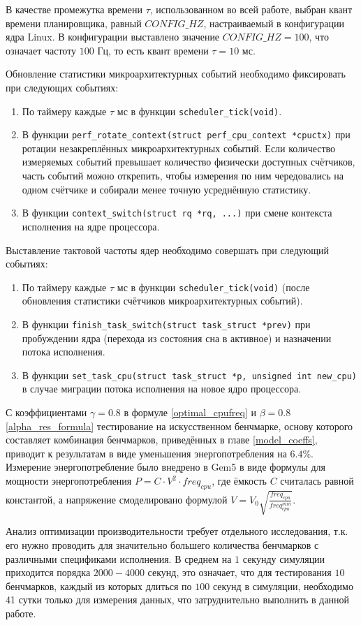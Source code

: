     В качестве промежутка времени $\tau$, использованном во всей работе, выбран квант времени планировщика,
    равный $CONFIG\_HZ$, настраиваемый в конфигурации ядра Linux. В конфигурации выставлено значение
    $CONFIG\_HZ = 100$, что означает частоту $100$ Гц, то есть квант времени $\tau = 10$ мс.

    Обновление статистики микроархитектурных событий необходимо фиксировать при следующих событиях:
    \begin{enumerate}
        \item По таймеру каждые $\tau$ мс в функции \lstinline{scheduler_tick(void)}.
        \item В функции \lstinline{perf_rotate_context(struct perf_cpu_context *cpuctx)} при ротации
        незакреплённых микроархитектурных событий. Если количество измеряемых событий
        превышает количество физически доступных счётчиков, часть событий можно открепить, чтобы измерения по ним
        чередовались на одном счётчике и собирали менее точную усреднённую статистику.
        \item В функции \lstinline{context_switch(struct rq *rq, ...)} при смене контекста исполнения на
        ядре процессора.
    \end{enumerate}

    Выставление тактовой частоты ядер необходимо совершать при следующий событиях:
    \begin{enumerate}
        \item По таймеру каждые $\tau$ мс в функции \lstinline{scheduler_tick(void)} (после обновления статистики
        счётчиков микроархитектурных событий).
        \item В функции \lstinline{finish_task_switch(struct task_struct *prev)} при пробуждении ядра
        (перехода из состояния сна в активное) и назначении потока исполнения.
        \item В функции \lstinline{set_task_cpu(struct task_struct *p, unsigned int new_cpu)} в случае миграции
        потока исполнения на новое ядро процессора.
    \end{enumerate}

    С коэффициентами $\gamma = 0.8$ в формуле \eqref{optimal_cpufreq} и $\beta = 0.8$ \eqref{alpha_res_formula}
    тестирование на искусственном бенчмарке, основу которого составляет комбинация бенчмарков, приведённых в
    главе \ref{model_coeffs}, приводит к результатам в виде уменьшения энергопотребления на $6.4\%$. Измерение
    энергопотребление было внедрено в Gem5 в виде формулы для мощности энергопотребления $P = C \cdot V^2 \cdot freq_{cpu}$,
    где ёмкость $C$ считалась равной константой, а напряжение смоделировано формулой
    $V = V_0 \sqrt{\frac{freq_{cpu}}{freq_{cpu}^{min}}}$.

    Анализ оптимизации производительности требует отдельного исследования, т.к. его нужно проводить для значительно
    большего количества бенчмарков с различными спецификами исполнения. В среднем на $1$ секунду симуляции приходится
    порядка $2000-4000$ секунд, это означает, что для тестирования $10$ бенчмарков, каждый из которых длиться
    по $100$ секунд в симуляции, необходимо 41 сутки только для измерения данных, что затруднительно выполнить
    в данной работе.

\newpage
